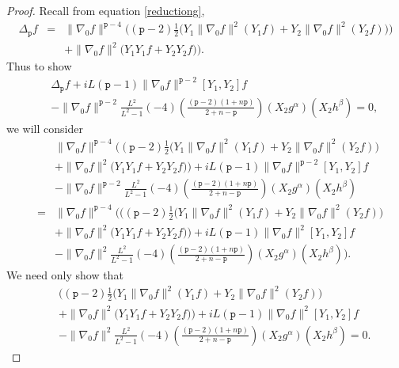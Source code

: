 \documentclass[12pt]{amsart}
\theoremstyle{plain}
\theoremstyle{definition}
\numberwithin{equation}{section}
\begin{document}
\begin{proof}
Recall from equation \eqref{reductiong}, 
\begin{eqnarray*}
\Delta_{\texttt{p}} f & = & \|\nabla_{0} f\|^{{\texttt{p}}-4}\bigg(({\texttt{p}}-2)\frac{1}{2}
\Big(Y_1\|\nabla_0f\|^2(Y_1f)+Y_2\|\nabla_0f\|^2(Y_2f)\Big)\bigg) \\
&& \mbox{}+\|\nabla_{0} f\|^{2}\big(Y_1Y_1f+Y_2Y_2f\big)\bigg).
\end{eqnarray*}
Thus to show 
\begin{eqnarray*}
& & \Delta_{\texttt{p}} f+iL({\texttt{p}}-1) \|\nabla_0 f \|^{{\texttt{p}}-2}[Y_1,Y_2]f  \\
& &\mbox{} -\|\nabla_0 f \|^{{\texttt{p}}-2} \frac{L^2}{L^2-1}(-4)\left(\frac{({\texttt{p}}-2)(1+n{\texttt{p}})}{2+n-{\texttt{p}}}\right)(X_2g^{\alpha})(X_2h^{\beta})=0,
\end{eqnarray*} 
we will consider
\begin{eqnarray*}
&& \|\nabla_{0} f\|^{{\texttt{p}}-4}\Big(({\texttt{p}}-2)\frac{1}{2}\Big(Y_1\|\nabla_0f\|^2(Y_1f)+Y_2\|\nabla_0f\|^2(Y_2f)\Big)\\
&&\mbox{}+\|\nabla_{0} f\|^{2}\big(Y_1Y_1f+Y_2Y_2f\big)\Big)+iL({\texttt{p}}-1) \|\nabla_0 f \|^{{\texttt{p}}-2}[Y_1,Y_2]f  \\
&&\mbox{}-\|\nabla_0 f \|^{{\texttt{p}}-2} \frac{L^2}{L^2-1}(-4)\left(\frac{({\texttt{p}}-2)(1+n{\texttt{p}})}{2+n-{\texttt{p}}}\right)(X_2g^{\alpha})(X_2h^{\beta})\\
&=&\|\nabla_{0} f\|^{{\texttt{p}}-4}\Bigg(\Big(({\texttt{p}}-2)\frac{1}{2}\Big(Y_1\|\nabla_0f\|^2(Y_1f)+Y_2\|\nabla_0f\|^2(Y_2f)\Big)\\
&&\mbox{}+\|\nabla_{0} f\|^{2}\big(Y_1Y_1f+Y_2Y_2f\big)\Big)+iL({\texttt{p}}-1) \|\nabla_0 f \|^{2}[Y_1,Y_2]f  \\
&&\mbox{}-\|\nabla_0 f \|^{2} \frac{L^2}{L^2-1}(-4)\left(\frac{({\texttt{p}}-2)(1+n{\texttt{p}})}{2+n-{\texttt{p}}}\right)(X_2g^{\alpha})(X_2h^{\beta})\Bigg).
\end{eqnarray*} 
We need only show that
\begin{eqnarray*}
&&\Big(({\texttt{p}}-2)\frac{1}{2}\Big(Y_1\|\nabla_0f\|^2(Y_1f)+Y_2\|\nabla_0f\|^2(Y_2f)\Big)\\
&&\mbox{}+\|\nabla_{0} f\|^{2}\big(Y_1Y_1f+Y_2Y_2f\big)\Big)+iL({\texttt{p}}-1) \|\nabla_0 f \|^{2}[Y_1,Y_2]f  \\
&&\mbox{}-\|\nabla_0 f \|^{2} \frac{L^2}{L^2-1}(-4)\left(\frac{({\texttt{p}}-2)(1+n{\texttt{p}})}{2+n-{\texttt{p}}}\right)(X_2g^{\alpha})(X_2h^{\beta})=0.

\end{eqnarray*}
\end{proof}
\end{document}
